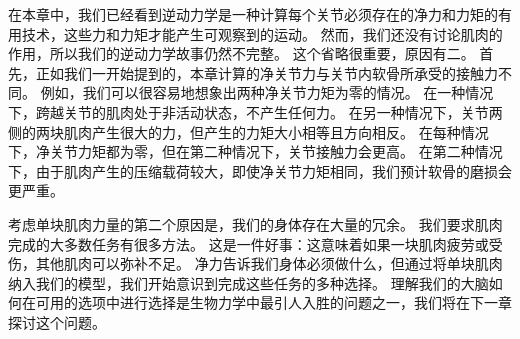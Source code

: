 在本章中，我们已经看到逆动力学是一种计算每个关节必须存在的净力和力矩的有用技术，这些力和力矩才能产生可​​观察到的运动。
然而，我们还没有讨论肌肉的作用，所以我们的逆动力学故事仍然不完整。
这个省略很重要，原因有二。
首先，正如我们一开始提到的，本章计算的净关节力与关节内软骨所承受的接触力不同。
例如，我们可以很容易地想象出两种净关节力矩为零的情况。
在一种情况下，跨越关节的肌肉处于非活动状态，不产生任何力。
在另一种情况下，关节两侧的两块肌肉产生很大的力，但产生的力矩大小相等且方向相反。
在每种情况下，净关节力矩都为零，但在第二种情况下，关节接触力会更高。
在第二种情况下，由于肌肉产生的压缩载荷较大，即使净关节力矩相同，我们预计软骨的磨损会更严重。


考虑单块肌肉力量的第二个原因是，我们的身体存在大量的冗余。
我们要求肌肉完成的大多数任务有很多方法。
这是一件好事：这意味着如果一块肌肉疲劳或受伤，其他肌肉可以弥补不足。
净力告诉我们身体必须做什么，但通过将单块肌肉纳入我们的模型，我们开始意识到完成这些任务的多种选择。
理解我们的大脑如何在可用的选项中进行选择是生物力学中最引人入胜的问题之一，我们将在下一章探讨这个问题。









